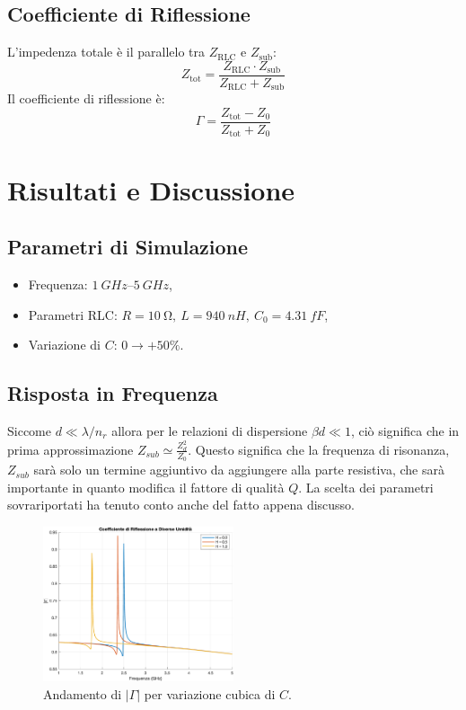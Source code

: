 \documentclass[conference]{IEEEtran}
\begin{document}
\subsection{Coefficiente di Riflessione}
L'impedenza totale è il parallelo tra \(Z_{\text{RLC}}\) e \(Z_{\text{sub}}\):
\[
Z_{\text{tot}} = \frac{Z_{\text{RLC}} \cdot Z_{\text{sub}}}{Z_{\text{RLC}} + Z_{\text{sub}}}
\]
Il coefficiente di riflessione è:
\[
\Gamma = \frac{Z_{\text{tot}} - Z_0}{Z_{\text{tot}} + Z_0}
\]

\section{Risultati e Discussione}
\subsection{Parametri di Simulazione}
\begin{itemize}
    \item Frequenza: \(\SIrange{1}{5}{GHz}\),
    \item Parametri RLC: \(R = \SI{10}{\ohm},\ L = \SI{940}{nH},\ C_0 = \SI{4.31}{fF}\),
    \item Variazione di \(C\): \(0 \to + 50\%\).
\end{itemize}

\subsection{Risposta in Frequenza}
Siccome $ d \ll \lambda/n_r$ allora per le relazioni di dispersione $\beta d \ll 1$, ciò significa che in prima approssimazione $Z_{sub} \simeq \frac{Z_d^2}{Z_0}$. Questo significa che  la frequenza di risonanza, $Z_{sub}$ sarà solo un termine aggiuntivo da aggiungere alla parte resistiva, che sarà importante in quanto modifica il fattore di qualità $Q$. La scelta dei parametri sovrariportati ha tenuto conto anche del fatto appena discusso.
\begin{figure}[ht!]
    \centering
    \includegraphics[width=0.5\textwidth]{img/grafico.png}
    \caption{Andamento di \(|\Gamma|\) per variazione cubica di \(C\). }
    \label{fig:gamma}
\end{figure}
\end{document}
